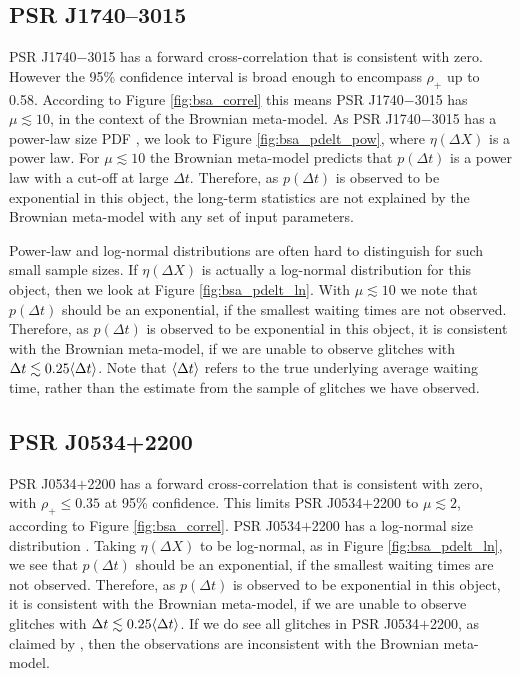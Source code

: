 \subsection{PSR J1740--3015}
PSR J1740$-$3015 has a forward cross-correlation that is consistent with zero. However the 95\% confidence interval is broad enough to encompass $\rho_+$ up to 0.58. According to Figure \ref{fig:bsa_correl} this means PSR J1740$-$3015 has $\mu \lesssim 10$, in the context of the Brownian meta-model. As PSR J1740$-$3015 has a power-law size PDF \citep{Fuentes2019}, we look to Figure \ref{fig:bsa_pdelt_pow}, where $\eta(\Delta X)$ is a power law. For $\mu \lesssim 10$ the Brownian meta-model predicts that $p(\Delta t)$ is a power law with a cut-off at large $\Delta t$. Therefore, as $p(\Delta t)$ is observed to be exponential in this object, the long-term statistics are not explained by the Brownian meta-model with any set of input parameters.

Power-law and log-normal distributions are often hard to distinguish for such small sample sizes. If $\eta(\Delta X)$ is actually a log-normal distribution for this object, then we look at Figure \ref{fig:bsa_pdelt_ln}. With $\mu \lesssim 10$ we note that $p(\Delta t)$ should be an exponential, if the smallest waiting times are not observed. Therefore, as $p(\Delta t)$ is observed to be exponential in this object, it is consistent with the Brownian meta-model, if we are unable to observe glitches with $\Delta t \lesssim 0.25 \langle \Delta t \rangle$. Note that $\langle \Delta t \rangle$ refers to the true underlying average waiting time, rather than the estimate from the sample of glitches we have observed. 

\subsection{PSR J0534+2200}
PSR J0534$+$2200 has a forward cross-correlation that is consistent with zero, with $\rho_+ \leq 0.35$ at 95\% confidence. This limits PSR J0534$+$2200 to $\mu \lesssim 2$, according to Figure \ref{fig:bsa_correl}. PSR J0534$+$2200 has a log-normal size distribution \citep{Fuentes2019}. Taking $\eta(\Delta X)$ to be log-normal, as in Figure \ref{fig:bsa_pdelt_ln}, we see that $p(\Delta t)$ should be an exponential, if the smallest waiting times are not observed. Therefore, as $p(\Delta t)$ is observed to be exponential in this object, it is consistent with the Brownian meta-model, if we are unable to observe glitches with $\Delta t \lesssim 0.25 \langle \Delta t \rangle$. If we do see all glitches in PSR J0534$+$2200, as claimed by \citet{Espinoza2014}, then the observations are inconsistent with the Brownian meta-model.

